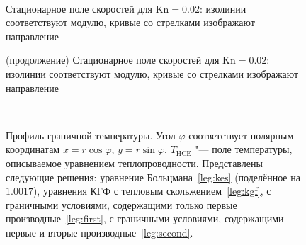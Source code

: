 \documentclass[
aps,%
12pt,%
final,%
notitlepage,%
oneside,%
onecolumn,%
nobibnotes,%
nofootinbib,%
superscriptaddress,%
noshowpacs,%
showkeys,%
floatfix,%
tightenlines,%
centertags]%
{revtex4}
\newcommand{\Kn}{\mathrm{Kn}}
\begin{document}
\begin{figure}
    \centering
    \\
    \caption{Стационарное поле скоростей для \(\Kn=0.02\):
        изолинии соответствуют модулю, кривые со стрелками изображают направление}
\end{figure}

\begin{figure}
    \ContinuedFloat %
    \caption{(продолжение) Стационарное поле скоростей для \(\Kn=0.02\):
        изолинии соответствуют модулю, кривые со стрелками изображают направление}
    \label{fig:elliptic:flow}
\end{figure}

\begin{figure}
    \setcounter{subfigure}{0}
    \centering
    \\
    \caption{
        Профиль граничной температуры. Угол \(\varphi\) соответствует полярным координатам
        \(x=r\cos\varphi\), \(y=r\sin\varphi\). \(T_{\mathrm{HCE}}\) "--- поле температуры,
        описываемое уравнением теплопроводности.
        Представлены следующие решения: уравнение Больцмана~\ref{leg:kes} (поделённое на \(1.0017\)),
        уравнения КГФ с тепловым скольжением~\ref{leg:kgf},
        с граничными условиями, содержащими только первые производные~\ref{leg:first},
        с граничными условиями, содержащими первые и вторые производные~\ref{leg:second}.
    }
    \label{fig:profile-temp}
\end{figure}
\end{document}
